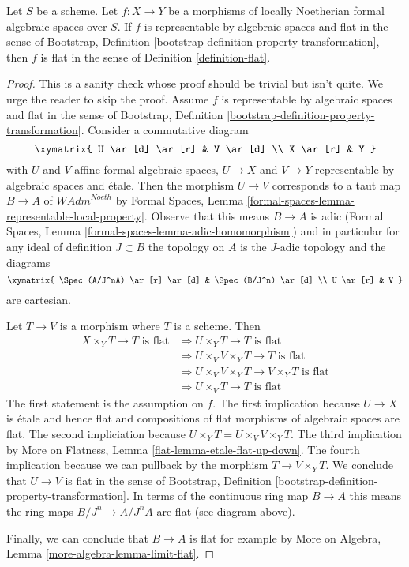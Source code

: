 \begin{lemma}
\label{lemma-representable-flat}
Let $S$ be a scheme. Let $f : X \to Y$ be a morphisms of
locally Noetherian formal algebraic spaces over $S$.
If $f$ is representable by algebraic spaces and
flat in the sense of Bootstrap, Definition
\ref{bootstrap-definition-property-transformation},
then $f$ is flat in the sense of Definition \ref{definition-flat}.
\end{lemma}

\begin{proof}
This is a sanity check whose proof should be trivial but isn't quite.
We urge the reader to skip the proof.
Assume $f$ is representable by algebraic spaces and
flat in the sense of Bootstrap, Definition
\ref{bootstrap-definition-property-transformation}.
Consider a commutative diagram
$$
\xymatrix{
U \ar[d] \ar[r] & V \ar[d] \\
X \ar[r] & Y
}
$$
with $U$ and $V$ affine formal algebraic spaces, $U \to X$ and $V \to Y$
representable by algebraic spaces and \'etale.
Then the morphism $U \to V$
corresponds to a taut map $B \to A$ of $\textit{WAdm}^{Noeth}$ by
Formal Spaces, Lemma
\ref{formal-spaces-lemma-representable-local-property}.
Observe that this means $B \to A$ is adic (Formal Spaces, Lemma
\ref{formal-spaces-lemma-adic-homomorphism})
and in particular for any ideal of definition $J \subset B$
the topology on $A$ is the $J$-adic topology and the diagrams
$$
\xymatrix{
\Spec(A/J^nA) \ar[r] \ar[d] & \Spec(B/J^n) \ar[d] \\
U \ar[r] & V
}
$$
are cartesian.

\medskip\noindent
Let $T \to V$ is a morphism where $T$ is a scheme. Then
\begin{align*}
X \times_Y T \to T\text{ is flat}
& \Rightarrow
U \times_Y T \to T\text{ is flat} \\
& \Rightarrow
U \times_V V \times_Y T \to T\text{ is flat} \\
& \Rightarrow
U \times_V V \times_Y T \to V \times_Y T\text{ is flat} \\
& \Rightarrow
U \times_V T \to T\text{ is flat}
\end{align*}
The first statement is the assumption on $f$.
The first implication because $U \to X$ is \'etale and hence flat
and compositions of flat morphisms of algebraic spaces are flat.
The second impliciation because $U \times_Y T = U \times_V V \times_Y T$.
The third implication by
More on Flatness, Lemma \ref{flat-lemma-etale-flat-up-down}.
The fourth implication because we can pullback by the morphism
$T \to V \times_Y T$.
We conclude that $U \to V$ is flat in the sense of
Bootstrap, Definition
\ref{bootstrap-definition-property-transformation}.
In terms of the continuous ring map $B \to A$
this means the ring maps $B/J^n \to A/J^nA$ are flat (see diagram above).

\medskip\noindent
Finally, we can conclude that $B \to A$ is flat for example
by More on Algebra, Lemma \ref{more-algebra-lemma-limit-flat}.
\end{proof}





